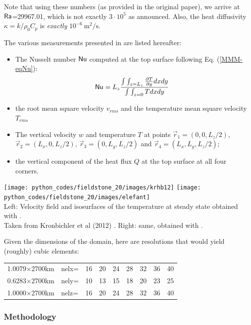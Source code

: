 Note that using these numbers (as provided in the original paper), we arrive at ${\mathsf{Ra}}$=29967.01, which 
is not exactly $3\cdot10^5$ as announced. Also, the heat diffusivity $\kappa=k/\rho_0 C_p$ is 
{\it exactly} $10^{-6}~\si{\square\meter\per\second}$.

The various measurements presented in \cite{bucc94} are listed hereafter:
\begin{itemize}
\item The Nusselt number ${\mathsf{Nu}}$ computed at the top surface following Eq. (\ref{MMM-eqNu}):
\[
{\mathsf{Nu}} = L_z \frac{\int\int_{z=L_z} \frac{\partial T}{\partial y} dx dy  }{\int \int_{z=0} T dx dy}
\]
\item the root mean square velocity $v_{rms}$ and the temperature mean square velocity $T_{rms}$
\item The vertical velocity $w$ and temperature $T$ at points $\vec{r}_1=(0,0,L_z/2)$, 
$\vec{r}_2=(L_x,0,L_z/2)$,
$\vec{r}_3=(0,L_y,L_z/2)$ and $\vec{r}_4=(L_x,L_y,L_z/2)$;
\item the vertical component of the heat flux $Q$ at the top surface  at all four corners. 
\end{itemize}

\begin{center}
\texttt{[image: python\_codes/fieldstone\_20/images/krhb12]}
\texttt{[image: python\_codes/fieldstone\_20/images/elefant]}\\
{\captionfont Left: 
Velocity field and isosurfaces of the temperature at steady state obtained 
with \aspect.\\ Taken from Kronbichler et al (2012) \cite{krhb12}.
Right: same, obtained with \elefant \cite{thie14}.}
\end{center}


\noindent Given the dimensions of the domain, here are resolutions that would yield (roughly) cubic elements:
\begin{center}
\begin{tabular}{l|lccccccc|}
1.0079$\times$2700km&nelx= &16 &20 &24 &28 &32 &36 &40 \\  
0.6283$\times$2700km&nely= &10 &13 &15 &18 &20 &23 &25 \\
1.0000$\times$2700km&nelz= &16 &20 &24 &28 &32 &36 &40 \\  
\end{tabular}
\end{center}

\subsubsection*{Methodology}

